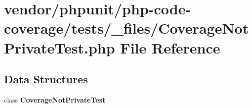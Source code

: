 \section{vendor/phpunit/php-\/code-\/coverage/tests/\+\_\+files/\+Coverage\+Not\+Private\+Test.php File Reference}
\label{php-code-coverage_2tests_2__files_2_coverage_not_private_test_8php}
\subsection*{Data Structures}
\begin{DoxyCompactItemize}
\item 
class {\bf Coverage\+Not\+Private\+Test}
\end{DoxyCompactItemize}
